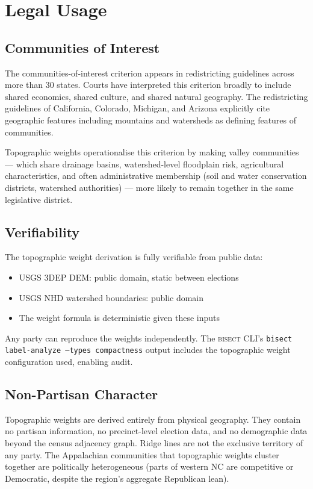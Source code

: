 \section{Legal Usage}

\subsection{Communities of Interest}

The communities-of-interest criterion appears in redistricting guidelines across more than 30 states. Courts have interpreted this criterion broadly to include shared economics, shared culture, and shared natural geography. The redistricting guidelines of California, Colorado, Michigan, and Arizona explicitly cite geographic features including mountains and watersheds as defining features of communities.

Topographic weights operationalise this criterion by making valley communities — which share drainage basins, watershed-level floodplain risk, agricultural characteristics, and often administrative membership (soil and water conservation districts, watershed authorities) — more likely to remain together in the same legislative district.

\subsection{Verifiability}

The topographic weight derivation is fully verifiable from public data:
\begin{itemize}
  \item USGS 3DEP DEM: public domain, static between elections
  \item USGS NHD watershed boundaries: public domain
  \item The weight formula is deterministic given these inputs
\end{itemize}

Any party can reproduce the weights independently. The \textsc{bisect} CLI's \texttt{bisect label-analyze --types compactness} output includes the topographic weight configuration used, enabling audit.

\subsection{Non-Partisan Character}

Topographic weights are derived entirely from physical geography. They contain no partisan information, no precinct-level election data, and no demographic data beyond the census adjacency graph. Ridge lines are not the exclusive territory of any party. The Appalachian communities that topographic weights cluster together are politically heterogeneous (parts of western NC are competitive or Democratic, despite the region's aggregate Republican lean).

